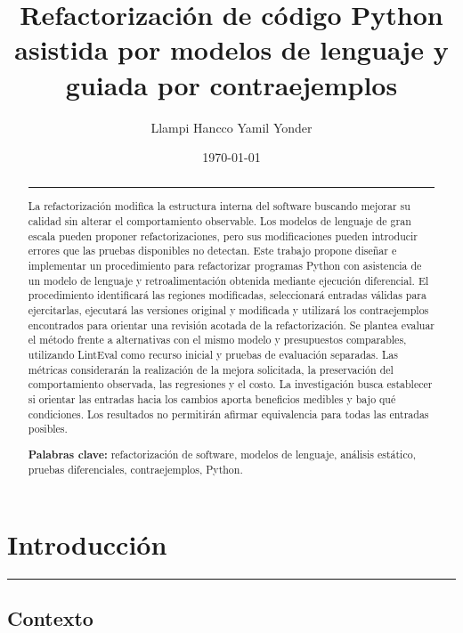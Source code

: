 \documentclass[11pt,openright,final]{unsa}
\title{Refactorización de código Python asistida por modelos de lenguaje y guiada por contraejemplos}
\author{Llampi Hancco Yamil Yonder}
\date{\today}
\begin{document}
\hypersetup{pageanchor=false}
\makeFirstCover\makeSecondCover
\hypersetup{pageanchor=true}
\begin{frontmatter}

\begin{abstract}\hrule\bigskip\vspace*{1cm}

La refactorización modifica la estructura interna del software buscando mejorar su calidad sin alterar el comportamiento observable. Los modelos de lenguaje de gran escala pueden proponer refactorizaciones, pero sus modificaciones pueden introducir errores que las pruebas disponibles no detectan. Este trabajo propone diseñar e implementar un procedimiento para refactorizar programas Python con asistencia de un modelo de lenguaje y retroalimentación obtenida mediante ejecución diferencial. El procedimiento identificará las regiones modificadas, seleccionará entradas válidas para ejercitarlas, ejecutará las versiones original y modificada y utilizará los contraejemplos encontrados para orientar una revisión acotada de la refactorización. Se plantea evaluar el método frente a alternativas con el mismo modelo y presupuestos comparables, utilizando LintEval como recurso inicial y pruebas de evaluación separadas. Las métricas considerarán la realización de la mejora solicitada, la preservación del comportamiento observada, las regresiones y el costo. La investigación busca establecer si orientar las entradas hacia los cambios aporta beneficios medibles y bajo qué condiciones. Los resultados no permitirán afirmar equivalencia para todas las entradas posibles.

\textbf{Palabras clave:} refactorización de software, modelos de lenguaje, análisis estático, pruebas diferenciales, contraejemplos, Python.

\end{abstract}\begin{singlespace}\small\tableofcontents\normalsize\end{singlespace}\end{frontmatter}\pagestyle{fancyplain}
\chapter{Introducción}
\hrule\bigskip\vspace*{1cm}

\section{Contexto}
\end{document}
